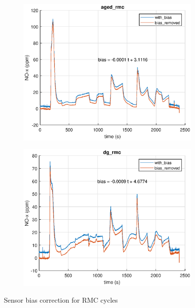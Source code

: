 \begin{figure}[H]
    \begin{minipage}{0.4\textwidth}
        \begin{figure}[H]
            \includegraphics[width=\textwidth]{./figs/chi_est/aged_rmc_NOx_bias.eps}
        \end{figure}
    \end{minipage}
    \begin{minipage}{0.4\textwidth}
        \begin{figure}[H]
            \includegraphics[width=\textwidth]{./figs/chi_est/dg_rmc_NOx_bias.eps}
        \end{figure}
    \end{minipage}
        \caption{Sensor bias correction for RMC cycles}
\end{figure}



